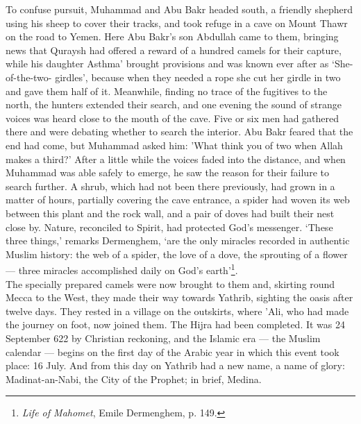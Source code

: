 \documentclass[10pt, twoside,openright]{book}
\begin{document}
To confuse pursuit, Muhammad and Abu Bakr headed south, a friendly shepherd using his sheep to cover 
their tracks, and took refuge in a cave on Mount Thawr on the road to Yemen. Here Abu Bakr's son 
Abdullah came to them, bringing news that Quraysh had offered a reward of a hundred camels for their 
capture, while his daughter Asthma' brought provisions and was known ever after as `She\hyp{}of\hyp{}the\hyp{}two\hyp{}
girdles', because when they needed a rope she cut her girdle in two and gave them half of it. 
Meanwhile, finding no trace of the fugitives to the north, the hunters extended their search, and one 
evening the sound of strange voices was heard close to the mouth of the cave. Five or six men had 
gathered there and were debating whether to search the interior. Abu Bakr feared that the end had 
come, but Muhammad asked him: 'What think you of two when Allah makes a third?' After a little while 
the voices faded into the distance, and when Muhammad was able safely to emerge, he saw the reason 
for their failure to search further. A shrub, which had not been there previously, had grown in a 
matter of hours, partially covering the cave entrance, a spider had woven its web between this plant 
and the rock wall, and a pair of doves had built their nest close by. Nature, reconciled to Spirit, 
had protected God's messenger. `These three things,' remarks Dermenghem, `are the only miracles 
recorded in authentic Muslim history: the web of a spider, the love of a dove, the sprouting of a 
flower --- three miracles accomplished daily on God's earth'\footnote{\emph{Life of Mahomet}, Emile Dermenghem, p. 149.}. \\

The specially prepared camels were now brought to them and, skirting round Mecca to the West, they 
made their way towards Yathrib, sighting the oasis after twelve days. They rested in a village on the 
outskirts, where 'Ali, who had made the journey on foot, now joined them. The Hijra had been 
completed. It was 24 September 622 by Christian reckoning, and the Islamic era --- the Muslim calendar 
--- begins on the first day of the Arabic year in which this event took place: 16 July. And from this 
day on Yathrib had a new name, a name of glory: Madinat\hyp{}an\hyp{}Nabi, the City of the Prophet; in brief, 
Medina. \\
\end{document}
